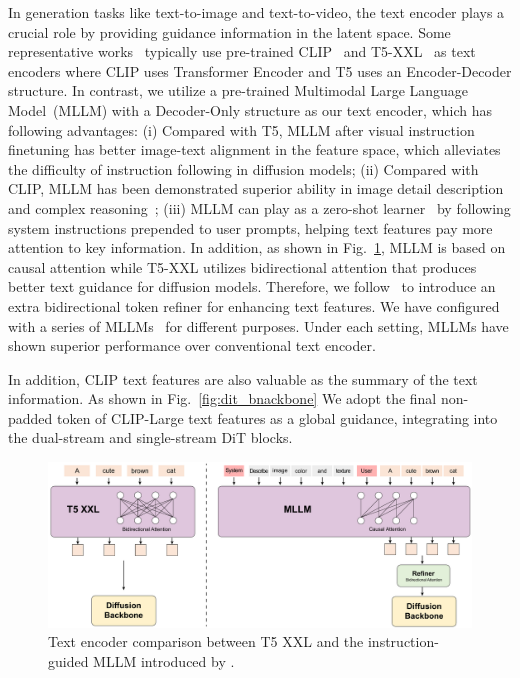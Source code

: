 In generation tasks like text-to-image and text-to-video, the text encoder plays a crucial role by providing guidance information in the latent space. Some representative works~\cite{podell2023sdxl, esser2024scaling, li2024hunyuandit} typically use pre-trained CLIP~\cite{radford2021learning} and T5-XXL~\cite{raffel2020exploring} as text encoders where CLIP uses Transformer Encoder and T5 uses an Encoder-Decoder structure. In contrast, we utilize a pre-trained Multimodal Large Language Model~(MLLM) with a Decoder-Only structure as our text encoder, which has following advantages: (i) Compared with T5, MLLM after visual instruction finetuning has better image-text alignment in the feature space, which alleviates the difficulty of instruction following in diffusion models; (ii) Compared with CLIP, MLLM has been demonstrated superior ability in image detail description and complex reasoning~\cite{liu2024visual}; (iii) MLLM can play as a zero-shot learner~\cite{brown2020language} by following system instructions prepended to user prompts, helping text features pay more attention to key information. In addition, as shown in Fig.~\ref{fig:text-encoder}, MLLM is based on causal attention while T5-XXL utilizes bidirectional attention that produces better text guidance for diffusion models. Therefore, we follow~\cite{ma2024exploring} to introduce an extra bidirectional token refiner for enhancing text features.
%
We have configured \nameofmethod{} with a series of MLLMs~\cite{sun2024hunyuanlargeopensourcemoemodel,2023xtuner,glm2024chatglm} for different purposes. Under each setting, MLLMs have shown superior performance over conventional text encoder.

In addition, CLIP text features are also valuable as the summary of the text information. As shown in Fig.~\ref{fig:dit_bnackbone} We adopt the final non-padded token of CLIP-Large text features as a global guidance, integrating into the dual-stream and single-stream DiT blocks. 

\begin{figure}[t]
    \centering
    \includegraphics[width=0.9\linewidth]{figures/text_encoder_en.pdf}
    \caption{Text encoder comparison between T5 XXL and the instruction-guided MLLM introduced by \nameofmethod{}.}
    \label{fig:text-encoder}
\end{figure}


